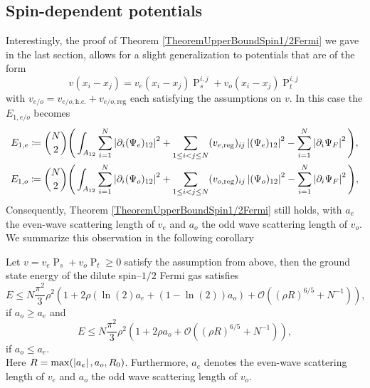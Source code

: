\subsection{Spin-dependent potentials}
Interestingly, the proof of Theorem \ref{TheoremUpperBoundSpin1/2Fermi} we gave in the last section, allows for a slight generalization to potentials that are of the form \begin{equation}
v(x_i-x_j)=v_e(x_i-x_j) \operatorname{P}^{i,j}_s+v_o(x_i-x_j)\operatorname{P}^{i,j}_t
\end{equation} 
with $  v_{e/o}=v_{e/o,\text{h.c.}}+v_{e/o,\text{reg}} $ each satisfying the assumptions on $ v $. In this case the $ E_{1,e/o} $ becomes
\begin{equation}
\begin{aligned}
E_{1,e}\coloneqq\binom{N}{2}\Bigg(\int_{A_{12}}\sum_{i=1}^{N}\left\lvert \partial_i(\Psi_e)_{12} \right\rvert^2
&+\sum_{1\leq i<j\leq N}(v_{e,\text{reg}})_{ij}\left\lvert (\Psi_e)_{12} \right\rvert^2-\sum_{i=1}^{N}\left\lvert \partial_i \Psi_F \right\rvert^2\Bigg),\\
E_{1,o}\coloneqq\binom{N}{2}\Bigg(\int_{A_{12}}\sum_{i=1}^{N}\left\lvert \partial_i(\Psi_o)_{12} \right\rvert^2
&+\sum_{1\leq i<j\leq N}(v_{o,\text{reg}})_{ij}\left\lvert (\Psi_o)_{12} \right\rvert^2-\sum_{i=1}^{N}\left\lvert \partial_i \Psi_F \right\rvert^2\Bigg),
\end{aligned}
\end{equation}
Consequently, Theorem \ref{TheoremUpperBoundSpin1/2Fermi} still holds, with $ a_e $ the even-wave scattering length of $ v_e $ and $ a_o $ the odd wave scattering length of $ v_o $. We summarize this observation in the following corollary
\begin{corollary}\label{CorollaryUpperBoundSpin1/2FermiSpinDependent}
	Let $ v=v_e\operatorname{P}_s+v_o\operatorname{P}_t\geq0 $ satisfy the assumption from above, then the ground state energy of the dilute spin--$ 1/2 $ Fermi gas satisfies\begin{equation}
	E\leq N\frac{\pi^2}{3}\rho^2\left(1+2\rho \left(\ln(2) a_e+(1-\ln(2))a_o\right)+\mathcal{O}\left((\rho R)^{6/5}+N^{-1}\right)\right),
	\end{equation}
	if $ a_o\geq a_e $ and 
	\begin{equation}
	E\leq N\frac{\pi^2}{3}\rho^2\left(1+2\rho a_o+\mathcal{O}\left((\rho R)^{6/5}+N^{-1}\right)\right),
	\end{equation}
	if $ a_o\leq a_e $.\\
	Here $ R=\max(\left\lvert a_e \right\rvert, a_o, R_0) $. Furthermore, $ a_e $ denotes the even-wave scattering length of $ v_e $ and $ a_o $ the odd wave scattering length of $ v_o $.
\end{corollary}
